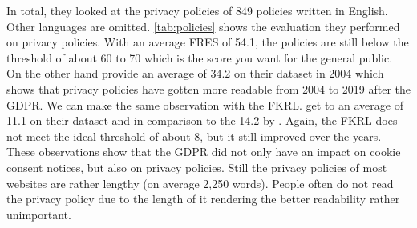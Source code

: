 In total, they looked at the privacy policies of 849 policies written in English. Other languages are omitted.
\autoref{tab:policies} shows the evaluation they performed on privacy policies. With an average FRES of 54.1, the
policies are still below the threshold of about 60 to 70 which is the score you want for the general public. On the
other hand  provide an average of 34.2 on their dataset in 2004 which shows that privacy policies
have gotten more readable from 2004 to 2019 after the GDPR. We can make the same observation with the FKRL. \citeauthor{sanchez2019can} get to an average
of 11.1 on their dataset and in comparison to the 14.2 by . Again, the FKRL does not meet the
ideal threshold of about 8, but it still improved over the years. These observations show that the GDPR did not only have
an impact on cookie consent notices, but also on privacy policies. Still the privacy policies of most websites are
rather lengthy (on average 2,250 words). People often do not read the privacy policy due to the length of it rendering
the better readability rather unimportant.

